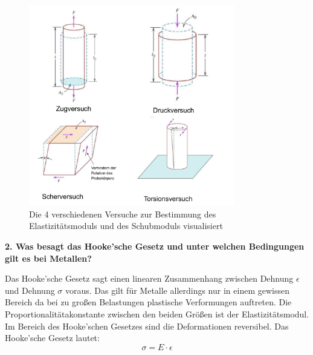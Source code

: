 \begin{addmargin}[25pt]{0pt}
\begin{figure}[h]
    \centering
    \includegraphics[width = 0.8\textwidth]{images/Materialwissenschaften/Modulnversuche.jpeg}
    \caption{Die 4 verschiedenen Versuche zur Bestimmung des Elastizitätsmoduls und des Schubmoduls visualisiert}
    \label{fig:Modulnversuche}
\end{figure}
\end{addmargin} 


\noindent\textbf{2. Was besagt das Hooke'sche Gesetz und unter welchen Bedingungen gilt es bei Metallen?}\\
\begin{addmargin}[25pt]{0pt}
Das Hooke'sche Gesetz sagt einen linearen Zusammenhang zwischen Dehnung $\epsilon$ und Dehnung $\sigma$ voraus. Das gilt für Metalle allerdings nur in einem gewissen Bereich da bei zu großen Belastungen plastische Verformungen auftreten. Die Proportionalitätakonstante zwischen den beiden Größen ist der Elastizitätsmodul. Im Bereich des Hooke'schen Gesetzes sind die Deformationen reversibel. Das Hooke'sche Gesetz lautet:
\begin{equation}\label{eq:Hooke_Gesetz}
    \sigma = E \cdot \epsilon
\end{equation}
\end{addmargin} 


